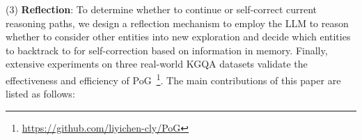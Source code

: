 \documentclass{article}
\begin{document}
(3) \textbf{Reflection}: 
To determine whether to continue or self-correct current reasoning paths, we design a reflection mechanism to employ the LLM to reason whether to consider other entities into new exploration and decide which entities to backtrack to for self-correction based on information in memory.
% 
Finally, extensive experiments on three real-world KGQA datasets validate the effectiveness and efficiency of PoG~\footnote{\url{https://github.com/liyichen-cly/PoG}}.
The main contributions of this paper are listed as follows:
\vspace{-0.2mm}
\end{document}
